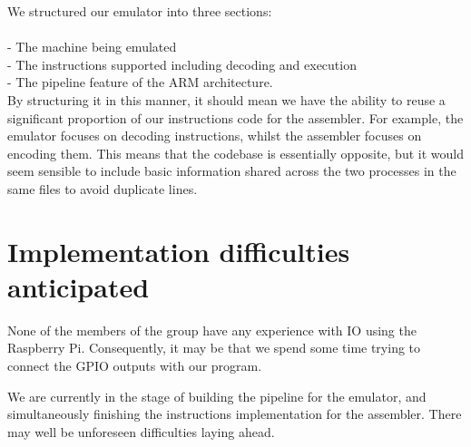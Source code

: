 \documentclass[11pt]{article}
\begin{document}
We structured our emulator into three sections: \\
\\
  - The machine being emulated \\
  - The instructions supported including decoding and execution \\
  - The pipeline feature of the ARM architecture.\\

By structuring it in this manner, it should mean we have the ability to reuse a significant proportion of our instructions code for the assembler. For example, the emulator focuses on decoding instructions, whilst the assembler focuses on encoding them. This means that the codebase is essentially opposite, but it would seem sensible to include basic information shared across the two processes in the same files to avoid duplicate lines.

\section{Implementation difficulties anticipated}

None of the members of the group have any experience with IO using the Raspberry Pi. Consequently, it may be that we spend some time trying to connect the GPIO outputs with our program. 

We are currently in the stage of building the pipeline for the emulator, and simultaneously finishing the instructions implementation for the assembler. There may well be unforeseen difficulties laying ahead.
\end{document}
